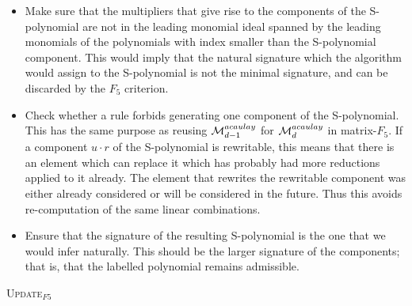 \begin{itemize}
 
 \item Make sure that the multipliers that give rise to the components of the S-polynomial are not in the leading monomial ideal spanned by the leading monomials of the polynomials with index smaller than the S-polynomial component. This would imply that the natural signature which the algorithm would assign to the S-polynomial is not the minimal signature, and can be discarded by the $F_5$ criterion.

 \item Check whether a rule forbids generating one component of the S-polynomial. This has the same purpose as reusing $\mathcal{M}^{acaulay}_{d-1}$ for $\mathcal{M}^{acaulay}_{d}$ in matrix-$F_5$. If a component $u \cdot r$ of the S-polynomial is rewritable, this means that there is an element which can replace it which has probably had more reductions applied to it already. The element that rewrites the rewritable component was either already considered or will be considered in the future. Thus this avoids re-computation of the same linear combinations.

 \item Ensure that the signature of the resulting S-polynomial is the one that we would infer naturally. This should be the larger signature of the components; that is, that the labelled polynomial remains admissible.
\end{itemize}

\begin{algorithm}[htbp]
\caption{\textsc{Update}$_{F5}$}
\label{alg:critpair} 
\end{algorithm}

